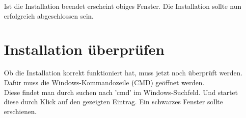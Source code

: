 \documentclass[ngerman,oneside, a4letter]{article}
\begin{document}
\begin{center}
\end{center}
Ist die Installation beendet erscheint obiges Fenster. Die Installation sollte nun erfolgreich abgeschlossen sein.

\clearpage

\section{Installation überprüfen}\label{check_installation}
Ob die Installation korrekt funktioniert hat, muss jetzt noch überprüft werden. Dafür muss die Windows-Kommandozeile (CMD) geöffnet werden.
\\Diese findet man durch suchen nach 'cmd' im Windows-Suchfeld. Und startet diese durch Klick auf den gezeigten Eintrag. Ein schwarzes Fenster sollte erschienen.

\begin{center}
\end{center}
\end{document}
